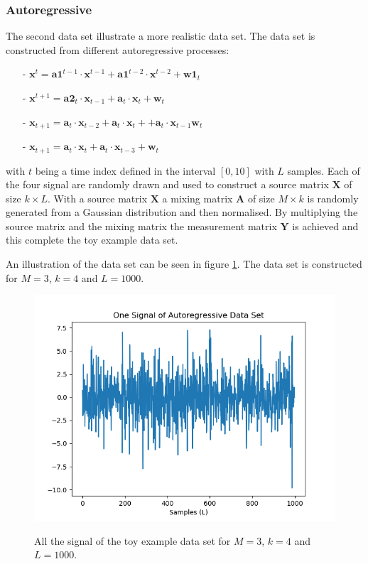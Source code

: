 \subsubsection{Autoregressive}
The second data set illustrate a more realistic data set.
The data set is constructed from different autoregressive processes: 
\begin{itemize}
\item[-] $\mathbf{x}^{t} = \mathbf{a1}^{t-1} \cdot \mathbf{x}^{t-1} + \mathbf{a1}^{t-2} \cdot \mathbf{x}^{t-2} + \mathbf{w1}_t$
\item[-] $\mathbf{x}^{t+1} = \mathbf{a2}_t \cdot \mathbf{x}_{t-1} + \mathbf{a}_t \cdot \mathbf{x}_t + \mathbf{w}_t$
\item[-] $\mathbf{x}_{t+1} = \mathbf{a}_t \cdot \mathbf{x}_{t-2} + \mathbf{a}_t \cdot \mathbf{x}_t + + \mathbf{a}_t \cdot \mathbf{x}_{t-1} \mathbf{w}_t$
\item[-] $\mathbf{x}_{t+1} = \mathbf{a}_t \cdot \mathbf{x}_t + \mathbf{a}_t \cdot \mathbf{x}_{t-3} + \mathbf{w}_t$
\end{itemize}
with $t$ being a time index defined in the interval $[0,10]$ with $L$ samples. Each of the four signal are randomly drawn and used to construct a source matrix $\mathbf{X}$ of size $k \times L$. 
With a source matrix $\mathbf{X}$ a mixing matrix $\mathbf{A}$ of size $M \times k$ is randomly generated from a Gaussian distribution and then normalised. By multiplying the source matrix and the mixing matrix the measurement matrix $\mathbf{Y}$ is achieved and this complete the toy example data set.

An illustration of the data set can be seen in figure \ref{fig:mix}. The data set is constructed for $M = 3$, $k = 4$ and $L = 1000$.
\begin{figure}[H]
\centering
\includegraphics[scale=0.5]{figures/chapter6/AR_Data_m3_n4_k4_L1000.png}
\label{fig:mix}
\caption{All the signal of the toy example data set for $M = 3$, $k=4$ and $L=1000$.}
\end{figure}
\noindent

